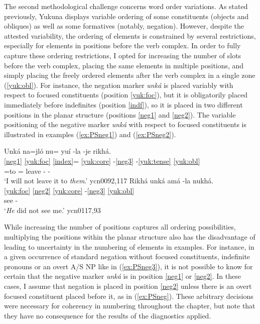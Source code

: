 \documentclass[output=paper]{langscibook}
\begin{document}
\hspace*{-4.1pt}The second methodological challenge concerns word order variations. As stated previously, Yukuna displays variable ordering of some constituents (objects and obliques) as well as some formatives (notably, negation). However, despite the attested variability, the ordering of elements is constrained by several restrictions, especially for elements in positions before the verb complex. In order to fully capture these ordering restrictions, I opted for increasing the number of slots before the verb complex, placing the same elements in multiple positions, and simply placing the freely ordered elements after the verb complex in a single zone (\ref{yuk:obl}). For instance, the negation marker \textit{unká} is placed variably with respect to focused constituents (position \ref{yuk:foc}), but it is obligatorily placed immediately before indefinites (position \ref{indf}), so it is placed in two different positions in the planar structure (positions \ref{neg1} and \ref{neg2}). The variable positioning of the negative marker \textit{unká} with respect to focused constituents is illustrated in examples (\ref{ex:PSneg1}) and (\ref{ex:PSneg2}).


\ea \label{ex:PSneg}
	\ea \label{ex:PSneg1}
    \glll Unká na=jló nu= yuí -la -je rikhá.	\\
		    \ref{neg1} \ref{yuk:foc} \ref{index}= \ref{yuk:core} -\ref{neg3} -\ref{yuk:tense} \ref{yuk:obl} \\
			\Neg{} \Tpl{}=to \Fsg{}= leave -\Neg{} -\Fut{} \Tsg{}\\
	\glt `I will not leave it to \textit{them}.' \hfill ycn0092,117
		\ex \label{ex:PSneg2}
	\glll Rikhá  unká amá -la nukhá.\\
	    \ref{yuk:foc} \ref{neg2} \ref{yuk:core} -\ref{neg3} \ref{yuk:obl}\\
			\Tsg{} \Neg{} see -\Neg{} \Fsg{}	\\
	\glt `\textit{He} did not see me.' \hfill ycn0117,93
	\z
\z

While increasing the number of positions captures all ordering possibilities, multiplying the positions within the planar structure also has the disadvantage of leading to uncertainty in the numbering of elements in examples. For instance, in a given occurrence of  standard negation without focused constituents, indefinite pronouns or an overt A/S NP like in (\ref{ex:PSneg3}), it is not possible to know for certain that the negative marker \textit{unká} is in position \ref{neg1} or \ref{neg2}. In these cases, I assume that negation is placed in position \ref{neg2} unless there is an overt focused constituent placed before it, as in (\ref{ex:PSneg}). These arbitrary decisions were necessary for coherency in numbering throughout the chapter, but note that they have no consequence for the results of the diagnostics applied. 
\end{document}
